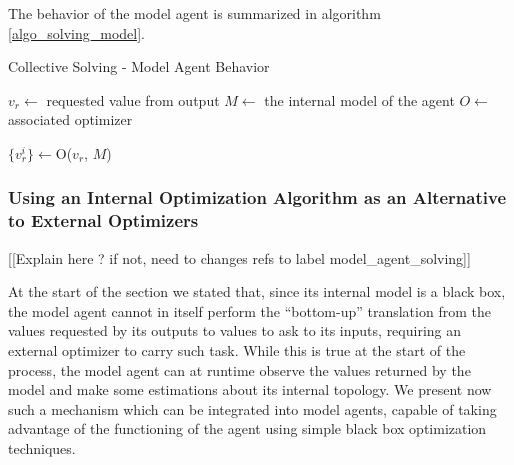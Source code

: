 The behavior of the model agent is summarized in algorithm \ref{algo_solving_model}.

\begin{algorithm}
\caption{Collective Solving - Model Agent Behavior}
\label{algo_solving_model}

	$v_r \leftarrow$ requested value from output\;
	$M \leftarrow$ the internal model of the agent\;
	$O \leftarrow$ associated optimizer\;
	
	$\{v_r^i\} \leftarrow $O($v_r$, $M$) \;
\end{algorithm}

\subsubsection*{Using an Internal Optimization Algorithm as an Alternative to External Optimizers}

[[Explain here ? if not, need to changes refs to label model_agent_solving]]

At the start of the section we stated that, since its internal model is a black box, the model agent cannot in itself perform the \enquote{bottom-up} translation from the values requested by its outputs to values to ask to its inputs, requiring an external optimizer to carry such task. While this is true at the start of the process, the model agent can at runtime observe the values returned by the model and make some estimations about its internal topology. We present now such a mechanism which can be integrated into model agents, capable of taking advantage of the functioning of the agent using simple black box optimization techniques.

